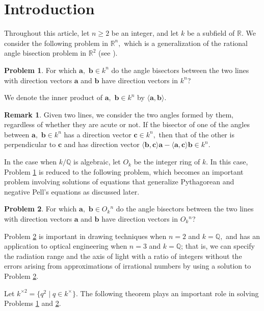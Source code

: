 \documentclass{article}
\theoremstyle{definition}
\newtheorem{q}{Problem}
\newtheorem{rmk}{Remark}
\theoremstyle{plain}
\begin{document}
\section{Introduction}\label{sec-intro}
Throughout this article, let $n \geq 2$ be an integer, and let $k$ be a subfield of $\mathbb R.$ 
We consider the following problem in $\mathbb R^n,$ which is a generalization of the rational angle bisection problem in $\mathbb R^2$ (see \cite{Hir24}).
\begin{q}\label{q-rat-bisec}
For which $\bm{a},$ $\bm{b} \in k^n$ do the angle bisectors between the two lines with direction vectors $\bm{a}$ and $\bm{b}$ have direction vectors in $k^n$?
\end{q}
We denote the inner product of $\bm{a},$ $\bm{b} \in k^n$ by $\langle\bm{a},\bm{b}\rangle.$
\begin{rmk}
Given two lines, we consider the two angles formed by them, regardless of whether they are acute or not. 
If the bisector of one of the angles between $\bm{a},$ $\bm{b} \in k^n$ has a direction vector $\bm{c} \in k^n,$ then that of the other is perpendicular to $\bm{c}$ and has direction vector $\langle\bm{b},\bm{c}\rangle\bm{a}-\langle\bm{a},\bm{c}\rangle\bm{b} \in k^n.$
\end{rmk}
In the case when $k/\mathbb Q$ is algebraic, let $O_k$ be the integer ring of $k.$ 
In this case, Problem \ref{q-rat-bisec} is reduced to the following problem, which becomes an important problem involving solutions of equations that generalize Pythagorean and negative Pell's equations as discussed later.
\begin{q}\label{q-int-bisec}
For which $\bm{a},$ $\bm{b} \in O_k{}^n$ do the angle bisectors between the two lines with direction vectors $\bm{a}$ and $\bm{b}$ have direction vectors in $O_k{}^n$?
\end{q}
Problem \ref{q-int-bisec} is important in drawing techniques when $n = 2$ and $k = \mathbb Q,$ and has an application to optical engineering when $n = 3$ and $k = \mathbb Q$; that is, we can specify the radiation range and the axis of light with a ratio of integers without the errors arising from approximations of irrational numbers by using a solution to Problem \ref{q-int-bisec}.\par
Let $k^{\times 2} = \{ q^2 \mid q \in k^\times\}.$ 
The following theorem plays an important role in solving Problems \ref{q-rat-bisec} and \ref{q-int-bisec}.
\end{document}
